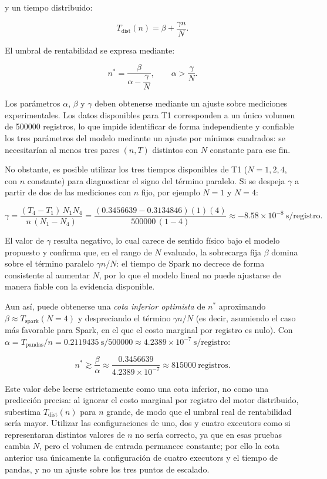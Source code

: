 \documentclass[12pt,a4paper]{article}
\begin{document}
y un tiempo distribuido:

\[
T_{\text{dist}}(n)=
\beta+
\frac{\gamma n}{N}.
\]

El umbral de rentabilidad se expresa mediante:

\begin{equation}
n^{*}=
\frac{\beta}
{\alpha-\dfrac{\gamma}{N}},
\qquad
\alpha>
\frac{\gamma}{N}.
\label{eq:umbral}
\end{equation}

Los parámetros $\alpha$, $\beta$ y $\gamma$ deben obtenerse mediante un ajuste
sobre mediciones experimentales. Los datos disponibles para T1 corresponden a
un único volumen de \num{500000} registros, lo que impide identificar de forma
independiente y confiable los tres parámetros del modelo mediante un ajuste
por mínimos cuadrados: se necesitarían al menos tres pares $(n,T)$ distintos
con $N$ constante para ese fin.

No obstante, es posible utilizar los tres tiempos disponibles de T1
($N=1,2,4$, con $n$ constante) para diagnosticar el signo del término
paralelo. Si se despeja $\gamma$ a partir de dos de las mediciones con $n$
fijo, por ejemplo $N=1$ y $N=4$:

\[
\gamma=
\frac{(T_4-T_1)\,N_1 N_4}{n\,(N_1-N_4)}
=
\frac{(0.3456639-0.3134846)(1)(4)}{500000\,(1-4)}
\approx
-8.58\times10^{-8}\ \text{s/registro}.
\]

El valor de $\gamma$ resulta negativo, lo cual carece de sentido físico bajo
el modelo propuesto y confirma que, en el rango de $N$ evaluado, la sobrecarga
fija $\beta$ domina sobre el término paralelo $\gamma n/N$: el tiempo de Spark
no decrece de forma consistente al aumentar $N$, por lo que el modelo lineal
no puede ajustarse de manera fiable con la evidencia disponible.

Aun así, puede obtenerse una \emph{cota inferior optimista} de $n^{*}$
aproximando $\beta\approx T_{\text{spark}}(N=4)$ y despreciando el término
$\gamma n/N$ (es decir, asumiendo el caso más favorable para Spark, en el que
el costo marginal por registro es nulo). Con
$\alpha=T_{\text{pandas}}/n=\SI{0.2119435}{\second}/\num{500000}\approx
4.2389\times10^{-7}\ \text{s/registro}$:

\[
n^{*}\gtrsim
\frac{\beta}{\alpha}
\approx
\frac{0.3456639}{4.2389\times10^{-7}}
\approx
\num{815000}\ \text{registros}.
\]

Este valor debe leerse estrictamente como una cota inferior, no como una
predicción precisa: al ignorar el costo marginal por registro del motor
distribuido, subestima $T_{\text{dist}}(n)$ para $n$ grande, de modo que el
umbral real de rentabilidad sería mayor. Utilizar las configuraciones de uno,
dos y cuatro executors como si representaran distintos valores de $n$ no sería
correcto, ya que en esas pruebas cambia $N$, pero el volumen de entrada
permanece constante; por ello la cota anterior usa únicamente la
configuración de cuatro executors y el tiempo de pandas, y no un ajuste sobre
los tres puntos de escalado.
\end{document}
